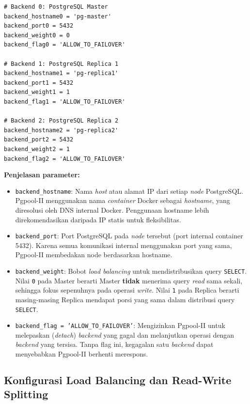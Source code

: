 \begin{lstlisting}[caption={Konfigurasi Backend Pgpool-II
(docker/pgpool/pgpool.conf)}, label={lst:pgpool-backend}]
# Backend 0: PostgreSQL Master
backend_hostname0 = 'pg-master'
backend_port0 = 5432
backend_weight0 = 0
backend_flag0 = 'ALLOW_TO_FAILOVER'

# Backend 1: PostgreSQL Replica 1
backend_hostname1 = 'pg-replica1'
backend_port1 = 5432
backend_weight1 = 1
backend_flag1 = 'ALLOW_TO_FAILOVER'

# Backend 2: PostgreSQL Replica 2
backend_hostname2 = 'pg-replica2'
backend_port2 = 5432
backend_weight2 = 1
backend_flag2 = 'ALLOW_TO_FAILOVER'
\end{lstlisting}

\textbf{Penjelasan parameter:}
\begin{itemize}
    \item \texttt{backend\_hostname}: Nama \textit{host} atau alamat IP
    dari setiap \textit{node} PostgreSQL. Pgpool-II menggunakan nama
    \textit{container} Docker sebagai \textit{hostname}, yang
    diresolusi oleh DNS internal Docker. Penggunaan hostname lebih
    direkomendasikan daripada IP statis untuk fleksibilitas.
    \item \texttt{backend\_port}: Port PostgreSQL pada \textit{node}
    tersebut (port internal container 5432). Karena semua komunikasi
    internal menggunakan port yang sama, Pgpool-II membedakan node
    berdasarkan hostname.
    \item \texttt{backend\_weight}: Bobot \textit{load balancing} untuk
    mendistribusikan query \texttt{SELECT}. Nilai \texttt{0} pada
    Master berarti Master \textbf{tidak} menerima query \textit{read}
    sama sekali, sehingga fokus sepenuhnya pada operasi
    \textit{write}. Nilai \texttt{1} pada Replica berarti
    masing-masing Replica mendapat porsi yang sama dalam distribusi
    query \texttt{SELECT}.
    \item \texttt{backend\_flag = 'ALLOW\_TO\_FAILOVER'}: Mengizinkan
    Pgpool-II untuk melepaskan (\textit{detach}) \textit{backend} yang
    gagal dan melanjutkan operasi dengan \textit{backend} yang tersisa.
    Tanpa flag ini, kegagalan satu \textit{backend} dapat menyebabkan
    Pgpool-II berhenti merespons.
\end{itemize}

\subsection{Konfigurasi Load Balancing dan Read-Write Splitting}

